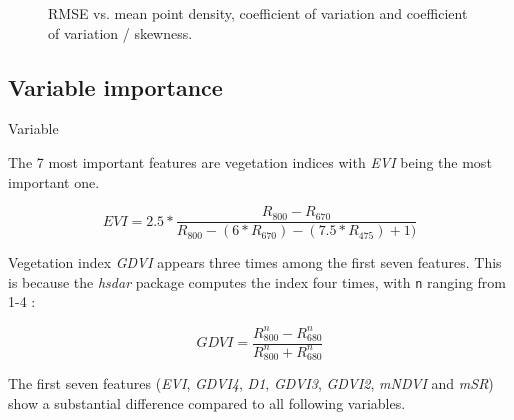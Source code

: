 \documentclass[review]{elsarticle}
\begin{document}
\begin{figure} [b!]
	\begin{center}
		\caption{RMSE vs. mean point density, coefficient of variation and coefficient of variation / skewness.}
		\label{fig:plot-characteristics}
	\end{center}
\end{figure}

\subsection{Variable importance}

Variable

The 7 most important features are vegetation indices with \textit{EVI} \citep{hueteComparisonVegetationIndices1997} being the most important one.

\begin{equation}
	EVI = 2.5*\frac{R_{800}-R_{670}}{R_{800}-(6*R_{670})-(7.5*R_{475})+1)}
\end{equation}

Vegetation index \textit{GDVI} appears three times among the first seven features.
This is because the \textit{hsdar} package computes the index four times, with \texttt{n} ranging from 1-4 \citep{wuEstimatingChlorophyllContent2008}:

\begin{equation}
	GDVI = \frac{R_{800}^n-R_{680}^n}{R_{800}^n+R_{680}^n}
\end{equation}

The first seven features (\textit{EVI}, \textit{GDVI4}, \textit{D1}, \textit{GDVI3}, \textit{GDVI2}, \textit{mNDVI} and \textit{mSR}) show a substantial difference compared to all following variables.
\end{document}
